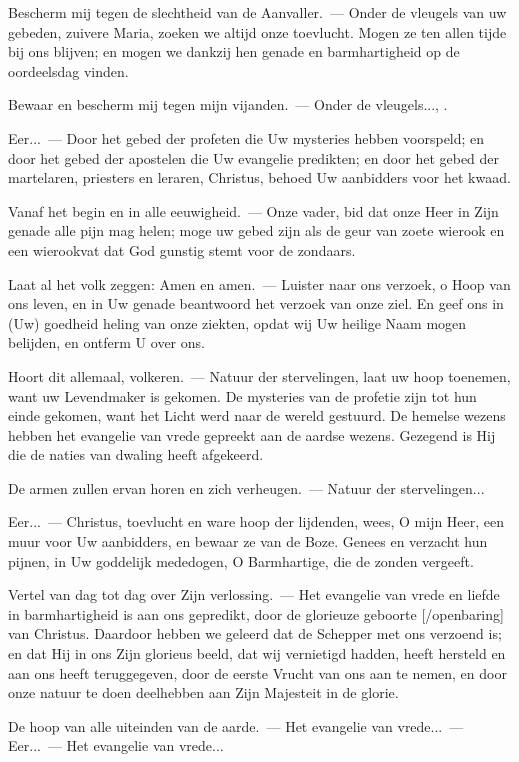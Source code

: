 \documentclass[12pt,twoside,a5paper]{article}
\begin{document}
\begin{halfparskip}
   Bescherm mij tegen de slechtheid van de Aanvaller.~--- Onder de vleugels van uw gebeden, zuivere Maria, zoeken we altijd onze toevlucht. Mogen ze ten allen tijde bij ons blijven; en mogen we dankzij hen genade en barmhartigheid op de oordeelsdag vinden.

  Bewaar en bescherm mij tegen mijn vijanden.~--- Onder de vleugels..., .

  Eer...~--- Door het gebed der profeten die Uw mysteries hebben voorspeld; en door het gebed der apostelen die Uw evangelie predikten; en door het gebed der martelaren, priesters en leraren, Christus, behoed Uw aanbidders voor het kwaad.

  Vanaf het begin en in alle eeuwigheid.~--- Onze vader, bid dat onze Heer in Zijn genade alle pijn mag helen; moge uw gebed zijn als de geur van zoete wierook en een wierookvat dat God gunstig stemt voor de zondaars.

  Laat al het volk zeggen: Amen en amen.~--- Luister naar ons verzoek, o Hoop van ons leven, en in Uw genade beantwoord het verzoek van onze ziel. En geef ons in (Uw) goedheid heling van onze ziekten, opdat wij Uw heilige Naam mogen belijden, en ontferm U over ons.
\end{halfparskip}

\begin{halfparskip}
   Hoort dit allemaal, volkeren.~--- Natuur der stervelingen, laat uw hoop toenemen, want uw Levendmaker is gekomen. De mysteries van de profetie zijn tot hun einde gekomen, want het Licht werd naar de wereld gestuurd. De hemelse wezens hebben het evangelie van vrede gepreekt aan de aardse wezens. Gezegend is Hij die de naties van dwaling heeft afgekeerd.

  De armen zullen ervan horen en zich verheugen.~--- Natuur der stervelingen...

  Eer...~--- Christus, toevlucht en ware hoop der lijdenden, wees, O mijn Heer, een muur voor Uw aanbidders, en bewaar ze van de Boze. Genees en verzacht hun pijnen, in Uw goddelijk mededogen, O Barmhartige, die de zonden vergeeft.
\end{halfparskip}

\begin{halfparskip}
   Vertel van dag tot dag over Zijn verlossing.~--- Het evangelie van vrede en liefde in barmhartigheid is aan ons gepredikt, door de glorieuze geboorte [/openbaring] van Christus. Daardoor hebben we geleerd dat de Schepper met ons verzoend is; en dat Hij in ons Zijn glorieus beeld, dat wij vernietigd hadden, heeft hersteld en aan ons heeft teruggegeven, door de eerste Vrucht van ons aan te nemen, en door onze natuur te doen deelhebben aan Zijn Majesteit in de glorie.

  De hoop van alle uiteinden van de aarde.~--- Het evangelie van vrede...~--- Eer...~--- Het evangelie van vrede...
\end{halfparskip}
\end{document}
